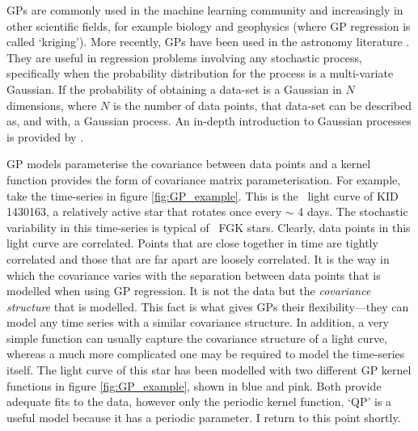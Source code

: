 GPs are commonly used in the machine learning community and increasingly
in other scientific fields, for example biology and geophysics (where GP
regression is called `kriging').
More recently, GPs have been used in the astronomy literature \citep[see
\eg][]{Gibson2012, Haywood2014, Haywood2015, Evans2015, Rajpaul2015,
Rajpaul2016, Aigrain2016}.
They are useful in regression problems involving any stochastic process,
specifically when the probability distribution for the process is a
multi-variate Gaussian.
If the probability of obtaining a data-set is a Gaussian in $N$ dimensions,
where $N$ is the number of data points, that data-set can be described as, and
with, a Gaussian process.
An in-depth introduction to Gaussian processes is provided by
\citet{Rasmussen2005}.

GP models parameterise the covariance between data points and a kernel
function provides the form of covariance matrix parameterisation.
For example, take the time-series in figure \ref{fig:GP_example}.
This is the \kepler\ light curve of KID 1430163, a relatively active star that
rotates once every $\sim$ 4 days.
The stochastic variability in this time-series is typical of \kepler\ FGK
stars.
Clearly, data points in this light curve are correlated.
Points that are close together in time are tightly correlated and those that
are far apart are loosely correlated.
It is the way in which the covariance varies with the separation between data
points that is modelled when using GP regression.
It is not the data but the {\it covariance structure} that is modelled.
This fact is what gives GPs their flexibility---they can model any time
series with a similar covariance structure.
In addition, a very simple function can usually capture the covariance
structure of a light curve, whereas a much more complicated one may be
required to model the time-series itself.
The light curve of this star has been modelled with two different GP kernel
functions in figure \ref{fig:GP_example}, shown in blue and pink.
Both provide adequate fits to the data, however only the periodic kernel
function, `QP' is a useful model because it has a periodic parameter.
I return to this point shortly.

